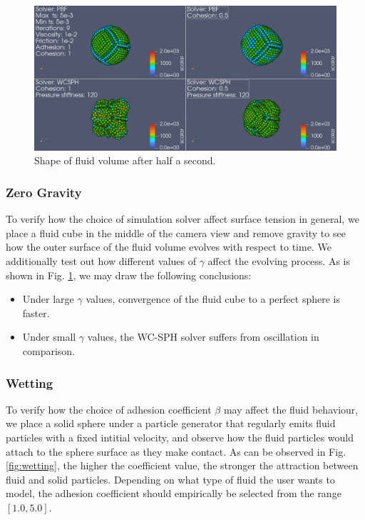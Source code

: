 \documentclass[
	11pt, 
	DIV10,
	ngerman,
	a4paper, 
	oneside, 
	headings=normal, 
	captions=tableheading,
	final, 
	numbers=noenddot
]{scrartcl}
\begin{document}
\begin{figure}[h]
    \centering
    \includegraphics[width=.6\textwidth]{pics/surface_tension.png}
    \caption{Shape of fluid volume after half a second.}
    \label{fig:no_gravity}
\end{figure}

\subsubsection{Zero Gravity}

To verify how the choice of simulation solver affect surface tension in general, we place a fluid cube in the middle of the camera view and remove gravity to see how the outer surface of the fluid volume evolves with respect to time. We additionally test out how different values of $ \gamma $ affect the evolving process. As is shown in Fig. \ref{fig:no_gravity}, we may draw the following conclusions:

\begin{itemize}
    \item Under large $ \gamma $ values, convergence of the fluid cube to a perfect sphere is faster.
    \item Under small $ \gamma $ values, the WC-SPH solver suffers from oscillation in comparison.
\end{itemize}

\subsubsection{Wetting}

To verify how the choice of adhesion coefficient $ \beta $ may affect the fluid behaviour, we place a solid sphere under a particle generator that regularly emits fluid particles with a fixed intitial velocity, and observe how the fluid particles would attach to the sphere surface as they make contact. As can be observed in Fig. \ref{fig:wetting}, the higher the coefficient value, the stronger the attraction between fluid and solid particles. Depending on what type of fluid the user wants to model, the adhesion coefficient should empirically be selected from the range $ [1.0, 5.0] $.
\end{document}
